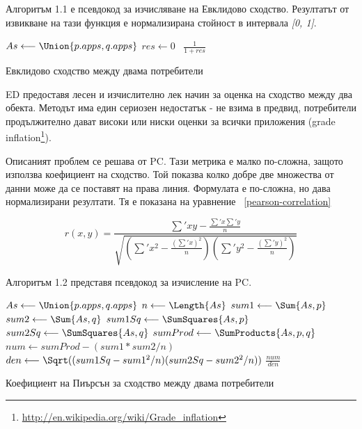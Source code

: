 		Алгоритъм 1.1 е псевдокод за изчисляване на Евклидово сходство. Резултатът от извикване на тази функция е нормализирана стойност в интервала \emph{[0, 1]}.
		
		\vspace{2em}		
		
		\begin{algorithm}[H]
			\label{algorithm:euclidean-distance}
			$As \longleftarrow \Union{p.apps, q.apps} $\;
			$res \longleftarrow 0$\;
			\
			\Return $\frac{1}{1 + res}$\;
			\caption{Евклидово сходство между двама потребители}
		\end{algorithm}
		
		\vspace{2em}
		
		\ac{ED} предоставя лесен и изчислително лек начин за оценка на сходство между два обекта. Методът има един сериозен недостатък - не взима в предвид, потребители продължително дават високи или ниски оценки за всички приложения (grade inflation\footnote{\url{http://en.wikipedia.org/wiki/Grade_inflation}}).
		
		Описаният проблем се решава от \ac{PC}. Тази метрика е малко по-сложна, защото използва коефициент на сходство. Той показва колко добре две множества от данни може да се поставят на права линия. Формулата е по-сложна, но дава нормализирани резултати. Тя е показана на уравнение ~\eqref{pearson-correlation}
		
		\begin{equation}\label{pearson-correlation}
			r(x, y) = \frac{\sum\nolimits'xy - \frac{\sum\nolimits'x\sum\nolimits'y}{n}}
			{\sqrt{(\sum\nolimits'x^2 - \frac{(\sum\nolimits'x)^2}{n})(\sum\nolimits'y^2 - \frac{(\sum\nolimits'y)^2}{n})}}
		\end{equation}
		
		Алгоритъм 1.2 представя псевдокод за изчисление на \ac{PC}.
		
		\vspace{2em}

		\begin{algorithm}[H]
			\label{algorithm:pearson-correlation}
			$As \longleftarrow \Union{p.apps, q.apps} $\;
			$n \longleftarrow \Length{As} $\;
			$sum1 \longleftarrow \Sum{As, p} $\;
			$sum2 \longleftarrow \Sum{As, q} $\;
			$sum1Sq \longleftarrow \SumSquares{As, p} $\;
			$sum2Sq \longleftarrow \SumSquares{As, q} $\;
			$sumProd \longleftarrow \SumProducts{As, p, q} $\;
			$num \longleftarrow sumProd - (sum1 * sum2 / n) $\;
			$den \longleftarrow \Sqrt((sum1Sq - sum1^2/n)(sum2Sq - sum2^2/n)) $\;
			\Return $\frac{num}{den}$\;
			\caption{Коефициент на Пиърсън за сходство между двама потребители}
		\end{algorithm}

